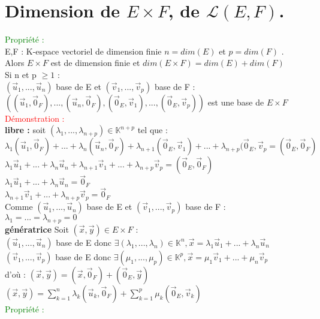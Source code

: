 \documentclass{article}
\begin{document}
\section{Dimension de $E \times F$, de $\mathcal L(E,F)$.}
\textcolor{green}{Propriété :} \\
E,F : K-espace vectoriel de dimension finie $n=dim(E)$ et $p=dim(F)$ . \\
Alors $E \times F$ est de dimension finie et $dim(E \times F)=dim(E) +dim(F)$ \\
Si n et p $\geq 1$ : \\
$(\vec u_1,..., \vec u_n)$ base de E et $(\vec v_1, ...,\vec v_p)$ base de F : \\
$((\vec u_1,\vec 0_F),...,(\vec u_n, \vec 0_F),(\vec 0_E, \vec v_1),...,(\vec 0_E, \vec v_p))$ est une base de $E \times F$ \\
\textcolor{red}{Démonstration :} \\
{\bf libre :} soit $(\lambda_1,...,\lambda_{n+p}) \in \mathbb K^{n+p}$ tel que : \\
$\lambda_1 (\vec u_1, \vec 0_F)+...+ \lambda_n (\vec u_n, \vec 0_F)+ \lambda_{n+1} (\vec 0_E, \vec v_1)+...+ \lambda_{n+p}(\vec 0_E, \vec v_p =(\vec 0_E, \vec 0_F)$ \\
$\lambda_1 \vec u_1+...+ \lambda_n \vec u_n + \lambda_{n+1}  \vec v_1 +...+ \lambda_{n+p} \vec v_p =(\vec 0_E, \vec 0_F)$ \\
$\lambda_1 \vec u_1+...+ \lambda_n \vec u_n =\vec 0_F$ \\
$\lambda_{n+1}  \vec v_1 +...+ \lambda_{n+p} \vec v_p =\vec 0_F$ \\
Comme $(\vec u_1,..., \vec u_n)$ base de E et $(\vec v_1,...,\vec v_p)$ base de F : \\
$\lambda_1=...=\lambda_{n+p}=0$ \\
{\bf génératrice} Soit $(\vec x, \vec y) \in E \times F$ : \\
$(\vec u_1,..., \vec u_n)$ base de E donc $\exists (\lambda_1,..., \lambda_n) \in \mathbb K^n, \vec x =\lambda_1 \vec u_1+...+ \lambda_n \vec u_n$ \\
$(\vec v_1,..., \vec v_p)$ base de E donc $\exists (\mu_1,..., \mu_p) \in \mathbb K^p, \vec x =\mu_1 \vec v_1+...+ \mu_n \vec v_p$ \\
d'où : $(\vec x, \vec y)= (\vec x, \vec 0_F)+ (\vec 0_E, \vec y)$ \\
$(\vec x, \vec y)=\sum_{k=1}^n \lambda_k (\vec u_k, \vec 0_F)+ \sum_{k=1}^p \mu_k (\vec 0_E, \vec v_k)$ \\
\textcolor{green}{Propriété :} \\
\end{document}
